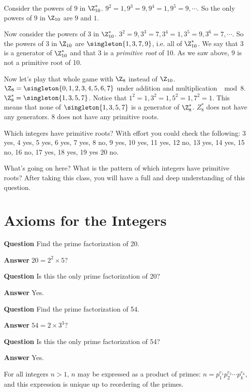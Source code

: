 \documentclass[oneside,12pt]{amsart}
\begin{document}
Consider the powers of $9$ in $\Z^*_{10}$. $9^2=1, 9^3 = 9, 9^4 =1, 9^5 = 9, \cdots$. So the only
powers of $9$ in $\Z_{10}$ are $9$ and $1$.

Now consider the powers of $3$ in $\Z^*_{10}$. $3^2=9, 3^3 = 7, 3^4 =1, 3^5 = 9, 3^6 = 7, \cdots$.
So the powers of $3$ in $\Z_{10}$ are $\singleton{1,3,7,9}$, i.e. all of $\Z^*_{10}$. We say
that $3$ is a generator of $\Z^*_{10}$ and that 3 is a \emph{primitive root} of 10. As we saw above,
9 is not a primitive root of 10.

Now let's play that whole game with $\Z_8$ instead of $\Z_{10}$.
$\Z_8 = \singleton{0,1,2,3,4,5,6,7}$ under addition and multiplication $\mod 8$.
$\Z^*_{8} = \singleton{1,3,5,7}$. Notice that $1^2 = 1, 3^2 = 1, 5^2 = 1, 7^2 = 1$. This means
that none of $\singleton{1,3,5,7}$ is a generator of $\Z^*_{8}$. $Z^*_{8}$ does not have any
generators. 8 does not have any primitive roots.

Which integers have primitive roots? With effort you could check the following:
3 yes, 4 yes, 5 yes, 6 yes, 7 yes, 8 no, 9 yes, 10 yes, 11 yes, 12 no, 13 yes, 14 yes, 15 no,
16 no, 17 yes, 18 yes, 19 yes 20 no.

What's going on here? What is the pattern of which integers have primitive roots? After taking
 this
class, you will have a full and deep understanding of this question.

\section{Axioms for the Integers}

\textbf{Question} Find the prime factorization of 20.

\textbf{Answer} $20=2^2 \times 5$?

\textbf{Question} Is this the only prime factorization of 20?

\textbf{Answer} Yes.

\textbf{Question} Find the prime factorization of 54.

\textbf{Answer} $54=2\times 3^3$?

\textbf{Question} Is this the only prime factorization of 54?

\textbf{Answer} Yes.

\begin{theorem} For all integers $n>1$, $n$ may be expressed as
a product of primes: $n=p_1^{e_1}p_2^{e_2}\cdots p_k^{e_k}$, and this expression is unique
up to reordering of the primes.
\end{theorem}
\end{document}
